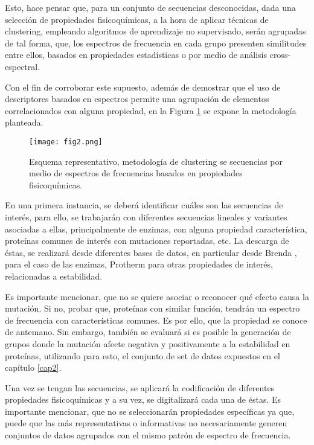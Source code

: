 Esto, hace pensar que, para un conjunto de secuencias desconocidas, dada una selección de propiedades fisicoquímicas, a la hora de aplicar técnicas de clustering, empleando algoritmos de aprendizaje no supervisado, serán agrupadas de tal forma, que, los espectros de frecuencia en cada grupo presenten similitudes entre ellos, basados en propiedades estadísticas o por medio de análisis cross-espectral.
 
Con el fin de corroborar este supuesto, además de demostrar que el uso de descriptores basados en espectros permite una agrupación de elementos correlacionados con alguna propiedad, en la Figura \ref{cap3:fig2} se expone la metodología planteada.

\begin{figure}[!h]
	
	\centering
	\texttt{[image: fig2.png]}
	\caption{Esquema representativo, metodología de clustering se secuencias por medio de espectros de frecuencias basados en propiedades fisicoquímicas.}
	\label{cap3:fig2}
\end{figure}

En una primera instancia, se deberá identificar cuáles son las secuencias de interés, para ello, se trabajarán con diferentes secuencias lineales y variantes asociadas a ellas, principalmente de enzimas, con alguna propiedad característica, proteínas comunes de interés con mutaciones reportadas, etc. La descarga de éstas, se realizará desde diferentes bases de datos, en particular desde Brenda \cite{schomburg2004brenda}, para el caso de las enzimas, Protherm \cite{bava2004protherm} para otras propiedades de interés, relacionadas a estabilidad. 

Es importante mencionar, que no se quiere asociar o reconocer qué efecto causa la mutación. Si no, probar que, proteínas con similar función, tendrán un espectro de frecuencia con características comunes. Es por ello, que la propiedad se conoce de antemano. Sin embargo, también se evaluará si es posible la generación de grupos donde la mutación afecte negativa y positivamente a la estabilidad en proteínas, utilizando para esto, el conjunto de set de datos expuestos en el capítulo \ref{cap2}.

Una vez se tengan las secuencias, se aplicará la codificación de diferentes propiedades fisicoquímicas y a su vez, se digitalizará cada una de éstas. Es importante mencionar, que no se seleccionarán propiedades específicas ya que, puede que las más representativas o informativas no necesariamente generen conjuntos de datos agrupados con el mismo patrón de espectro de frecuencia. 


